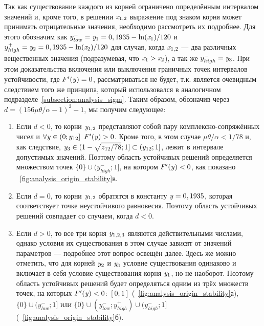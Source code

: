 Так как существование каждого из корней ограничено определённым интервалом значений и, кроме того, в решении $\mathit{x}_{1,2}$ выражение под знаком корня может принимать отрицательные значения, необходимо рассмотреть их подробнее. Для этого обозначим как $y_{low}^{-} = \mathit{y}_{1} = 0,1935 - \ln(\mathit{x}_{1})/120$ и $y_{high}^{+} = \mathit{y}_{2} = 0,1935 - \ln(\mathit{x}_{2})/120$ для случая, когда $\mathit{x}_{1,2}$ --- два различных вещественных значения (подразумевая, что $\mathit{x}_{1} > \mathit{x}_{2}$), а так же $y_{high}^{-} = \mathit{y}_{3}$. При этом доказательства включения или выключения граничных точек интервалов устойчивости, где $F^{\prime}(\mathit{y}) = 0$, рассматриваться не будет, т.к. является очевидным следствием того же принципа, который использовался в аналогичном подразделе~\autoref{subsection:analysis_sigm}. Таким образом, обозначив через $d = \left( 156 \mu \theta / \alpha - 1\right)^{2} - 1$, мы получим следующее:
\begin{enumerate}[wide]
    \item Если $d < 0$, то корни $\mathit{y}_{1,2}$ представляют собой пару комплексно-сопряжённых чисел и $\forall\scalar{y} \in \left(0; y_{12}\right]\ F^{\prime}(\scalar{y}) > 0$. Кроме того, в этом случае $\mu \theta / \alpha < 1 / 78$ и, как следствие, $\mathit{y}_{3} \in (1 - \sqrt{z_{12} / 78}; 1] \subset (y_{12}; 1]$, \ie лежит в интервале допустимых значений. Поэтому область устойчивых решений определяется множеством точек $\{0\} \cup (y_{high}^{-}; 1]$, на котором $F^{\prime}(\mathit{y}) < 0$, как показано \onfigure~\ref{fig:analysis_origin_stability}в.
    \item Если $d = 0$, то корни $\mathit{y}_{1,2}$ обратятся в константу $\mathit{y} = 0,1935$, которая соответствует точке неустойчивого равновесия. Поэтому область устойчивых решений совпадает со случаем, когда $d < 0$.
    \item Если $d > 0$, то все три корня $\mathit{y}_{1,2,3}$ являются действительными числами, однако условия их существования в этом случае зависят от значений параметров --- подробнее этот вопрос освещён далее. Здесь же можно отметить, что для корней $\mathit{y}_{2}$ и $\mathit{y}_{3}$ условие существования одинаково и включает в себя условие существования корня $\mathit{y}_{1}$, но не наоборот. Поэтому область устойчивых решений будет определяться одним из трёх множеств точек, на которых $F^{\prime}(\mathit{y}) < 0$: $[0; 1]$ (\seefigure~\ref{fig:analysis_origin_stability}а), $\{0\} \cup (y_{low}^{-}; 1]$ или $\{0\} \cup (y_{low}^{-}; y_{high}^{+}) \cup (y_{high}^{-}; 1]$ (\seefigure~\ref{fig:analysis_origin_stability}б).
\end{enumerate}

